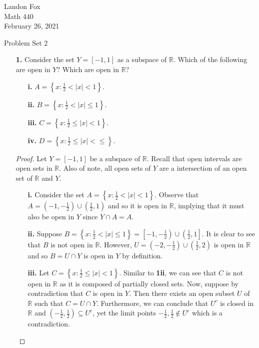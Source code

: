 \documentclass[ 12pt ]{article}
\begin{document}
\noindent Landon Fox \\
\noindent Math 440 \\
\noindent February 26, 2021

\begin{center}
	\Large Problem Set 2
\end{center}

\begin{enumerate}
	\item[\textbf{1.}] Consider the set $Y = [-1, 1]$ as a subspace of $\mathbb{R}$. Which of the following are open in $Y$? Which are open in $\mathbb{R}$?
		\begin{enumerate}
			\item[\textbf{i.}] $A = \left \{ x : \frac{1}{2} < |x| < 1 \right \}$.
			\item[\textbf{ii.}] $B = \left \{ x : \frac{1}{2} < |x| \leq 1 \right \}$.
			\item[\textbf{iii.}] $C = \left \{ x : \frac{1}{2} \leq |x| < 1 \right \}$.
			\item[\textbf{iv.}] $D = \left \{ x : \frac{1}{2} \leq |x| < \leq \right \}$.
		\end{enumerate}

		\begin{proof}
			Let $Y = [-1, 1]$ be a subspace of $\mathbb{R}$. Recall that open intervals are open sets in $\mathbb{R}$. Also of note, all open sets of $Y$ are a intersection of an open
			set of $\mathbb{R}$ and $Y$.
			\begin{enumerate}
				\item[\textbf{i.}] Consider the set $A = \left \{ x : \frac{1}{2} < |x| < 1 \right \}$. Observe that $A = \left(-1, -\frac{1}{2}\right) \cup \left(\frac{1}{2}, 1\right)$
					and so it is open in $\mathbb{R}$, implying that it must also be open in $Y$ since $Y \cap A = A$.

				\item[\textbf{ii.}] Suppose $B = \left \{ x : \frac{1}{2} < |x| \leq 1 \right \} = \left [ -1, -\frac{1}{2}\right) \cup \left ( \frac{1}{2}, 1\right]$. It is clear to see
					that $B$ is not open in $\mathbb{R}$. However, $U = \left(-2, -\frac{1}{2}\right) \cup \left(\frac{1}{2}, 2\right)$ is open in $\mathbb{R}$ and so $B = U \cap Y$ is
					open  in $Y$ by definition.

				\item[\textbf{iii.}] Let $C = \left \{ x : \frac{1}{2} \leq |x| < 1 \right \}$. Similar to \textbf{1ii}, we can see that $C$ is not open in $\mathbb{R}$ as it is composed
					of partially closed sets. Now, suppose by contradiction that $C$ is open in $Y$. Then there exists an open subset $U$ of $\mathbb{R}$ such that $C = U \cap Y$.
					Furthermore, we can conclude that $U^c$ is closed in $\mathbb{R}$ and $\left(-\frac{1}{2}, \frac{1}{2}\right) \subseteq U^c$, yet the limit points $-\frac{1}{2},
					\frac{1}{2} \notin U^c$ which is a contradiction.


\end{enumerate}
\end{proof}
\end{enumerate}
\end{document}
